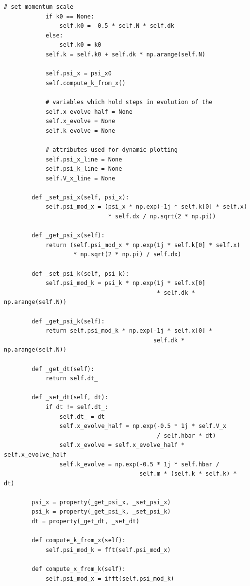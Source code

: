 \documentclass[UTF8,ctexart,a4paper,11pt,openany]{article}
\theoremstyle{definition}
\begin{document}
\begin{lstlisting}[aboveskip=0pt]
            # set momentum scale
            if k0 == None:
                self.k0 = -0.5 * self.N * self.dk
            else:
                self.k0 = k0
            self.k = self.k0 + self.dk * np.arange(self.N)
    
            self.psi_x = psi_x0
            self.compute_k_from_x()
    
            # variables which hold steps in evolution of the
            self.x_evolve_half = None
            self.x_evolve = None
            self.k_evolve = None
    
            # attributes used for dynamic plotting
            self.psi_x_line = None
            self.psi_k_line = None
            self.V_x_line = None
    
        def _set_psi_x(self, psi_x):
            self.psi_mod_x = (psi_x * np.exp(-1j * self.k[0] * self.x)
                              * self.dx / np.sqrt(2 * np.pi))
    
        def _get_psi_x(self):
            return (self.psi_mod_x * np.exp(1j * self.k[0] * self.x)
                    * np.sqrt(2 * np.pi) / self.dx)
    
        def _set_psi_k(self, psi_k):
            self.psi_mod_k = psi_k * np.exp(1j * self.x[0]
                                            * self.dk * np.arange(self.N))
    
        def _get_psi_k(self):
            return self.psi_mod_k * np.exp(-1j * self.x[0] *
                                           self.dk * np.arange(self.N))
    
        def _get_dt(self):
            return self.dt_
    
        def _set_dt(self, dt):
            if dt != self.dt_:
                self.dt_ = dt
                self.x_evolve_half = np.exp(-0.5 * 1j * self.V_x
                                            / self.hbar * dt)
                self.x_evolve = self.x_evolve_half * self.x_evolve_half
                self.k_evolve = np.exp(-0.5 * 1j * self.hbar /
                                       self.m * (self.k * self.k) * dt)
    
        psi_x = property(_get_psi_x, _set_psi_x)
        psi_k = property(_get_psi_k, _set_psi_k)
        dt = property(_get_dt, _set_dt)
    
        def compute_k_from_x(self):
            self.psi_mod_k = fft(self.psi_mod_x)
    
        def compute_x_from_k(self):
            self.psi_mod_x = ifft(self.psi_mod_k)
    

\end{lstlisting}
\end{document}
